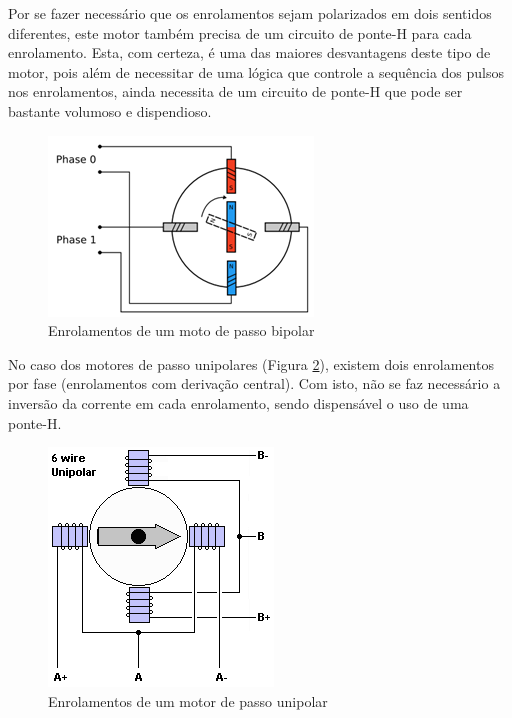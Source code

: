 \begin{anexosenv}
Por se fazer necessário que os enrolamentos sejam polarizados em dois sentidos diferentes, este motor também precisa de um circuito de ponte-H para cada enrolamento. Esta, com certeza, é uma das maiores desvantagens deste tipo de motor, pois além de necessitar de uma lógica que controle a sequência dos pulsos nos enrolamentos, ainda necessita de um circuito de ponte-H que pode ser bastante volumoso e dispendioso.

\begin{figure}[H]
		\centering
			\includegraphics[scale=1.0]{figuras/bipolar.png}
		\caption{Enrolamentos de um moto de passo bipolar}
		\label{bipolar}
\end{figure}

No caso dos motores de passo unipolares (Figura \ref{unipolar}), existem dois enrolamentos por fase (enrolamentos com derivação central). Com isto, não se faz necessário a inversão da corrente em cada enrolamento, sendo dispensável o uso de uma ponte-H.

\begin{figure}[H]
		\centering
			\includegraphics[scale=1.0]{figuras/unipolar.png}
		\caption{Enrolamentos de um motor de passo unipolar}
		\label{unipolar}
\end{figure}


\end{anexosenv}

